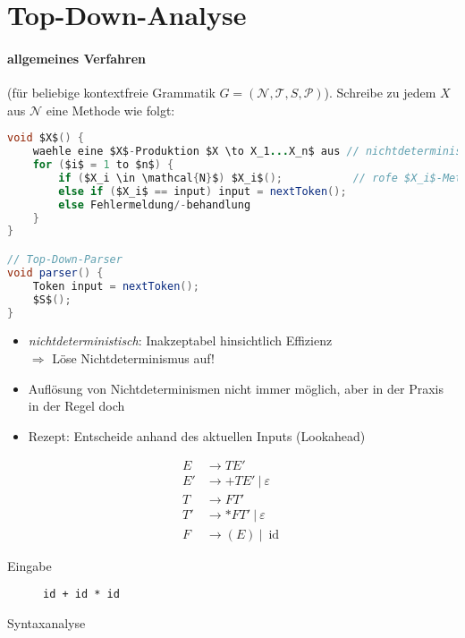 \section{Top-Down-Analyse}
\paragraph{allgemeines Verfahren} (für beliebige kontextfreie Grammatik $G = (\mathcal{N}, \mathcal{T}, S, \mathcal{P})$). Schreibe zu jedem $X$ aus $\mathcal{N}$ eine Methode wie folgt:
\begin{lstlisting}[language=Java,mathescape=true,morekeywords={to}]
void $X$() {
    waehle eine $X$-Produktion $X \to X_1...X_n$ aus // nichtdeterministisch 
    for ($i$ = 1 to $n$) {
        if ($X_i \in \mathcal{N}$) $X_i$();           // rofe $X_i$-Methode rekursiv auf
        else if ($X_i$ == input) input = nextToken();
        else Fehlermeldung/-behandlung
    }
}

// Top-Down-Parser
void parser() {
    Token input = nextToken();
    $S$();
}
\end{lstlisting}

\begin{itemize}
 \item \emph{nichtdeterministisch}: Inakzeptabel hinsichtlich Effizienz\\
         $\Rightarrow$ Löse Nichtdeterminismus auf!
 \item Auflösung von Nichtdeterminismen nicht immer möglich, aber in der Praxis in der Regel doch
 \item Rezept: Entscheide anhand des aktuellen Inputs (Lookahead)
\end{itemize}
\Bsp
\begin{align*}
 E &\to TE'\\
 E' &\to +TE'\ |\ \varepsilon \\
 T &\to FT' \\
 T' &\to *FT'\ |\ \varepsilon \\
 F &\to (E)\ |\ \operatorname{id}
\end{align*}
\begin{description}
 \item[Eingabe] \texttt{id + id * id}
 \item[Syntaxanalyse]
 \begin{center}
 \end{center}
\end{description}
